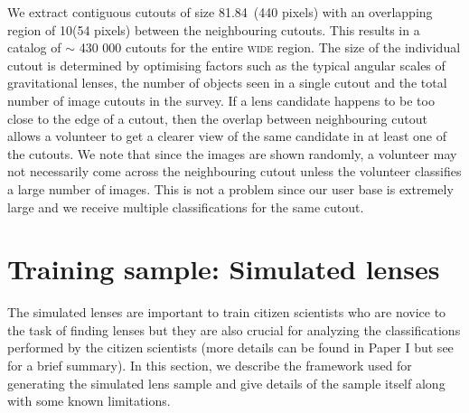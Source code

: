 \documentclass[useAMS,usenatbib,a4paper]{mn2e}
\begin{document}
We extract contiguous cutouts of size 81.84\arcsec\ (440 pixels) with an
overlapping region of 10\arcsec (54 pixels) between the neighbouring
cutouts. This  results in a catalog of $\sim$ 430 000 cutouts for the entire \cfhtls
\textsc{wide} region. The size of the individual cutout is determined by
optimising factors such as the typical angular scales of gravitational
lenses, the number of objects seen in a single cutout and the total
number of image cutouts in the survey. If a lens
candidate happens to be too close to the edge of a cutout, then the overlap
between neighbouring cutout allows a volunteer to get a clearer view
of the same candidate in at least one of the cutouts. We note that since
the images are shown randomly, a volunteer may not necessarily come
across the neighbouring cutout unless the volunteer classifies a large
number of images. This is not a problem since our user base is extremely
large and we receive multiple classifications for the same cutout.




\section{Training sample: Simulated lenses}
\label{sec:ts}

The simulated lenses are important to train citizen scientists who are
novice to the task of finding lenses but they are also crucial for
analyzing the classifications performed by the citizen scientists (more
details can be found in Paper I but see  for a brief
summary). In this section, we describe the framework used for generating the
simulated lens sample and give details of the sample itself along with
some known limitations. 
\end{document}
